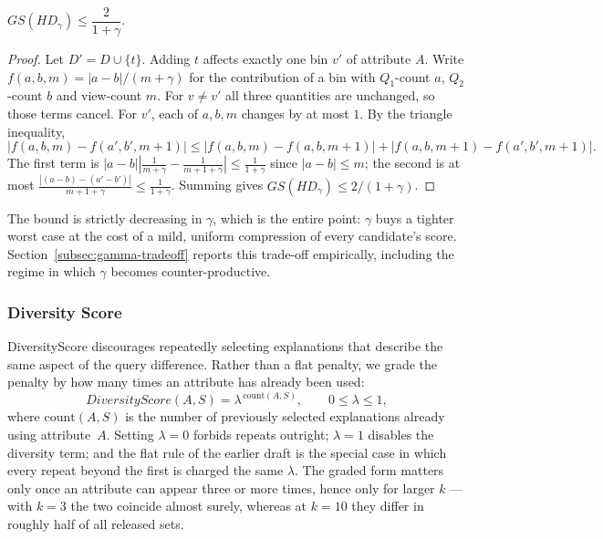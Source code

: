 \begin{proposition}
\label{prop:hd-sensitivity}
$GS(HD_\gamma)\le \dfrac{2}{1+\gamma}$.
\end{proposition}

\begin{proof}
Let $D'=D\cup\{t\}$.
Adding $t$ affects exactly one bin $v'$ of attribute $A$.
Write $f(a,b,m)=|a-b|/(m+\gamma)$ for the contribution of a bin with $Q_1$-count $a$, $Q_2$-count $b$ and view-count $m$.
For $v\neq v'$ all three quantities are unchanged, so those terms cancel.
For $v'$, each of $a,b,m$ changes by at most $1$. By the triangle inequality,
\[
|f(a,b,m)-f(a',b',m{+}1)| \le |f(a,b,m)-f(a,b,m{+}1)| + |f(a,b,m{+}1)-f(a',b',m{+}1)|.
\]
The first term is $|a-b|\left|\tfrac{1}{m+\gamma}-\tfrac{1}{m+1+\gamma}\right| \le \tfrac{1}{1+\gamma}$ since $|a-b|\le m$; the second is at most $\tfrac{|(a-b)-(a'-b')|}{m+1+\gamma}\le \tfrac{1}{1+\gamma}$.
Summing gives $GS(HD_\gamma)\le 2/(1+\gamma)$.
\end{proof}

The bound is strictly decreasing in $\gamma$, which is the entire point: $\gamma$ buys a tighter worst case at the cost of a mild, uniform compression of every candidate's score.
Section~\ref{subsec:gamma-tradeoff} reports this trade-off empirically, including the regime in which $\gamma$ becomes counter-productive.

\subsubsection{Diversity Score}
\label{subsubsec:diversity-score}

DiversityScore discourages repeatedly selecting explanations that describe the same aspect of the query difference.
Rather than a flat penalty, we grade the penalty by how many times an attribute has already been used:
\begin{equation}
DiversityScore(A,S)=\lambda^{\,\mathrm{count}(A,S)},
\qquad 0\le\lambda\le1,
\label{eq:diversity-score}
\end{equation}
where $\mathrm{count}(A,S)$ is the number of previously selected explanations already using attribute~$A$.
Setting $\lambda=0$ forbids repeats outright; $\lambda=1$ disables the diversity term; and the flat rule of the earlier draft is the special case in which every repeat beyond the first is charged the same $\lambda$.
The graded form matters only once an attribute can appear three or more times, hence only for larger $k$ --- with $k=3$ the two coincide almost surely, whereas at $k=10$ they differ in roughly half of all released sets.

